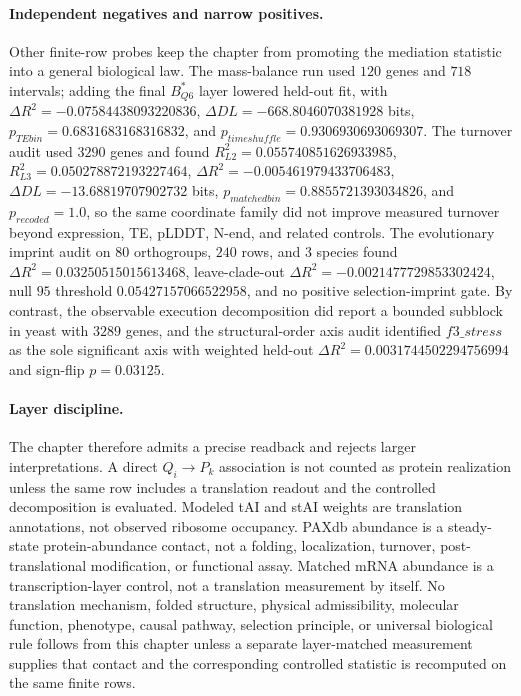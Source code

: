 \paragraph{Independent negatives and narrow positives.}
Other finite-row probes keep the chapter from promoting the mediation statistic into a general biological law.  The mass-balance run used $120$ genes and $718$ intervals; adding the final $B^*_{Q6}$ layer lowered held-out fit, with $\Delta R^2=-0.07584438093220836$, $\Delta DL=-668.8046070381928$ bits, $p_{TEbin}=0.6831683168316832$, and $p_{timeshuffle}=0.9306930693069307$.  The turnover audit used $3290$ genes and found $R^2_{L2}=0.055740851626933985$, $R^2_{L3}=0.050278872193227464$, $\Delta R^2=-0.005461979433706483$, $\Delta DL=-13.68819707902732$ bits, $p_{matchedbin}=0.8855721393034826$, and $p_{recoded}=1.0$, so the same coordinate family did not improve measured turnover beyond expression, TE, pLDDT, N-end, and related controls.  The evolutionary imprint audit on $80$ orthogroups, $240$ rows, and $3$ species found $\Delta R^2=0.03250515015613468$, leave-clade-out $\Delta R^2=-0.0021477729853302424$, null $95$ threshold $0.05427157066522958$, and no positive selection-imprint gate.  By contrast, the observable execution decomposition did report a bounded subblock in yeast with $3289$ genes, and the structural-order axis audit identified $f3\_stress$ as the sole significant axis with weighted held-out $\Delta R^2=0.0031744502294756994$ and sign-flip $p=0.03125$.

\paragraph{Layer discipline.}
The chapter therefore admits a precise readback and rejects larger interpretations.  A direct $Q_i \to P_k$ association is not counted as protein realization unless the same row includes a translation readout and the controlled decomposition is evaluated.  Modeled tAI and stAI weights are translation annotations, not observed ribosome occupancy.  PAXdb abundance is a steady-state protein-abundance contact, not a folding, localization, turnover, post-translational modification, or functional assay.  Matched mRNA abundance is a transcription-layer control, not a translation measurement by itself.  No translation mechanism, folded structure, physical admissibility, molecular function, phenotype, causal pathway, selection principle, or universal biological rule follows from this chapter unless a separate layer-matched measurement supplies that contact and the corresponding controlled statistic is recomputed on the same finite rows.

